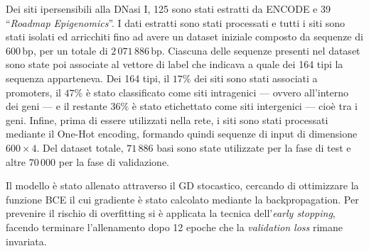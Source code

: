 Dei siti ipersensibili alla DNasi I, 125 sono stati estratti da \acs{ENCODE} e 39 ``\textit{Roadmap Epigenomics}''. I dati estratti sono stati processati e tutti i siti sono stati isolati ed arricchiti fino ad avere un dataset iniziale composto da sequenze di 600\,bp, per un totale di $2\,071\,886$\,bp. Ciascuna delle sequenze presenti nel dataset sono state poi associate al vettore di label che indicava a quale dei 164 tipi la sequenza apparteneva. Dei 164 tipi, il $17\%$ dei siti sono stati associati a promoters, il $47\%$ è stato classificato come siti intragenici — ovvero all'interno dei geni — e il restante $36\%$ è stato etichettato come siti intergenici — cioè tra i geni. Infine, prima di essere utilizzati nella rete, i siti sono stati processati mediante il One-Hot encoding, formando quindi sequenze di input di dimensione $600\times 4$. Del dataset totale, $71\,886$ basi sono state utilizzate per la fase di test e altre $70\,000$ per la fase di validazione.

Il modello è stato allenato attraverso il \acs{GD} stocastico, cercando di ottimizzare la funzione \acs{BCE} il cui gradiente è stato calcolato mediante la backpropagation. Per prevenire il rischio di overfitting si è applicata la tecnica dell'\textit{early stopping}, facendo terminare l'allenamento dopo 12 epoche che la \textit{validation loss} rimane invariata. %

